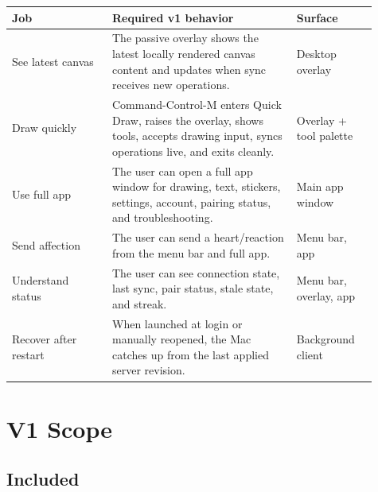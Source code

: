 \documentclass[11pt]{article}
\begin{document}
\begin{longtable}{p{0.25\linewidth} p{0.46\linewidth} p{0.2\linewidth}}
\toprule
\textbf{Job} & \textbf{Required v1 behavior} & \textbf{Surface} \\
\midrule
See latest canvas & The passive overlay shows the latest locally rendered canvas content and updates when sync receives new operations. & Desktop overlay \\
Draw quickly & Command-Control-M enters Quick Draw, raises the overlay, shows tools, accepts drawing input, syncs operations live, and exits cleanly. & Overlay + tool palette \\
Use full app & The user can open a full app window for drawing, text, stickers, settings, account, pairing status, and troubleshooting. & Main app window \\
Send affection & The user can send a heart/reaction from the menu bar and full app. & Menu bar, app \\
Understand status & The user can see connection state, last sync, pair status, stale state, and streak. & Menu bar, overlay, app \\
Recover after restart & When launched at login or manually reopened, the Mac catches up from the last applied server revision. & Background client \\
\bottomrule
\end{longtable}

\section{V1 Scope}

\subsection{Included}
\end{document}
